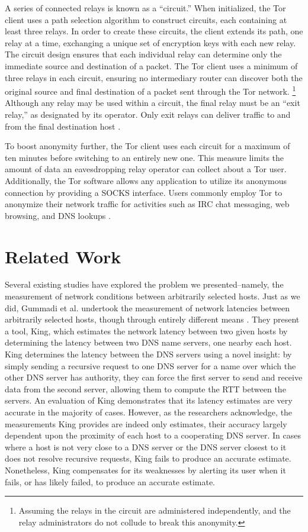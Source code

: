 \documentclass[twocolumn,11pt]{article}
\begin{document}
A series of connected relays is known as a ``circuit.'' When initialized, the Tor client uses a path selection algorithm to construct circuits, each containing at least three relays. In order to create these circuits, the client extends its path, one relay at a time, exchanging a unique set of encryption keys with each new relay. The circuit design ensures that each individual relay can determine only the immediate source and destination of a packet. The Tor client uses a minimum of three relays in each circuit, ensuring no intermediary router can discover both the original source and final destination of a packet sent through the Tor network. \footnote[1]{Assuming the relays in the circuit are administered independently, and the relay administrators do not collude to break this anonymity.} Although any relay may be used within a circuit, the final relay must be an ``exit relay,'' as designated by its operator. Only exit relays can deliver traffic to and from the final destination host \cite{tor_about}.

To boost anonymity further, the Tor client uses each circuit for a maximum of ten minutes before switching to an entirely new one. This measure limits the amount of data an eavesdropping relay operator can collect about a Tor user. Additionally, the Tor software allows any application to utilize its anonymous connection by providing a SOCKS interface. Users commonly employ Tor to anonymize their network traffic for activities such as IRC chat messaging, web browsing, and DNS lookups \cite{tor_about}.


\section{Related Work}

Several existing studies have explored the problem we presented--namely, the measurement of network conditions between arbitrarily selected hosts. Just as we did, Gummadi et al. undertook the measurement of network latencies between arbitrarily selected hosts, though through entirely different means \cite{Gummadi}. They present a tool, King, which estimates the network latency between two given hosts by determining the latency between two DNS name servers, one nearby each host. King determines the latency between the DNS servers using a novel insight: by simply sending a recursive request to one DNS server for a name over which the other DNS server has authority, they can force the first server to send and receive data from the second server, allowing them to compute the RTT between the servers. An evaluation of King demonstrates that its latency estimates are very accurate in the majority of cases. However, as the researchers acknowledge, the measurements King provides are indeed only estimates, their accuracy largely dependent upon the proximity of each host to a cooperating DNS server. In cases where a host is not very close to a DNS server or the DNS server closest to it does not resolve recursive requests, King fails to produce an accurate estimate. Nonetheless, King compensates for its weaknesses by alerting its user when it fails, or has likely failed, to produce an accurate estimate.
\end{document}
